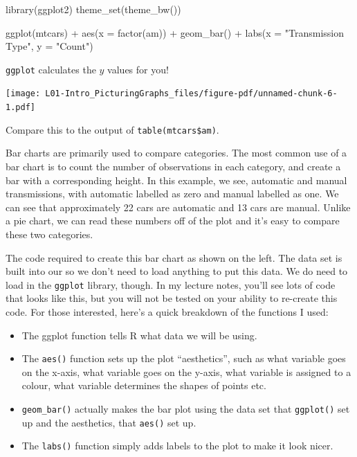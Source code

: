 \documentclass[
  letterpaper,
  DIV=11,
  numbers=noendperiod]{scrreprt}
\newenvironment{Shaded}{\begin{snugshade}}{\end{snugshade}}
\newcommand{\AttributeTok}[1]{\textcolor[rgb]{0.40,0.45,0.13}{#1}}
\newcommand{\FunctionTok}[1]{\textcolor[rgb]{0.28,0.35,0.67}{#1}}
\newcommand{\NormalTok}[1]{\textcolor[rgb]{0.00,0.23,0.31}{#1}}
\newcommand{\SpecialCharTok}[1]{\textcolor[rgb]{0.37,0.37,0.37}{#1}}
\newcommand{\StringTok}[1]{\textcolor[rgb]{0.13,0.47,0.30}{#1}}
\providecommand{\tightlist}{%
  \setlength{\itemsep}{0pt}\setlength{\parskip}{0pt}}\usepackage{longtable,booktabs,array}
\begin{document}
\begin{Shaded}
\begin{Highlighting}[]
\FunctionTok{library}\NormalTok{(ggplot2)}
\FunctionTok{theme\_set}\NormalTok{(}\FunctionTok{theme\_bw}\NormalTok{())}

\FunctionTok{ggplot}\NormalTok{(mtcars) }\SpecialCharTok{+}
    \FunctionTok{aes}\NormalTok{(}\AttributeTok{x =} \FunctionTok{factor}\NormalTok{(am)) }\SpecialCharTok{+}
    \FunctionTok{geom\_bar}\NormalTok{() }\SpecialCharTok{+}
    \FunctionTok{labs}\NormalTok{(}\AttributeTok{x =} \StringTok{"Transmission Type"}\NormalTok{,}
        \AttributeTok{y =} \StringTok{"Count"}\NormalTok{)}
\end{Highlighting}
\end{Shaded}

\texttt{ggplot} calculates the \(y\) values for you!

\texttt{[image: L01-Intro\_PicturingGraphs\_files/figure-pdf/unnamed-chunk-6-1.pdf]}

Compare this to the output of \texttt{table(mtcars\$am)}.

Bar charts are primarily used to compare categories. The most common use
of a bar chart is to count the number of observations in each category,
and create a bar with a corresponding height. In this example, we see,
automatic and manual transmissions, with automatic labelled as zero and
manual labelled as one. We can see that approximately 22 cars are
automatic and 13 cars are manual. Unlike a pie chart, we can read these
numbers off of the plot and it's easy to compare these two categories.

The code required to create this bar chart as shown on the left. The
data set is built into our so we don't need to load anything to put this
data. We do need to load in the \texttt{ggplot} library, though. In my
lecture notes, you'll see lots of code that looks like this, but you
will not be tested on your ability to re-create this code. For those
interested, here's a quick breakdown of the functions I used:

\begin{itemize}
\tightlist
\item
  The ggplot function tells R what data we will be using.
\item
  The \texttt{aes()} function sets up the plot ``aesthetics'', such as
  what variable goes on the x-axis, what variable goes on the y-axis,
  what variable is assigned to a colour, what variable determines the
  shapes of points etc.
\item
  \texttt{geom\_bar()} actually makes the bar plot using the data set
  that \texttt{ggplot()} set up and the aesthetics, that \texttt{aes()}
  set up.
\item
  The \texttt{labs()} function simply adds labels to the plot to make it
  look nicer.
\end{itemize}
\end{document}
